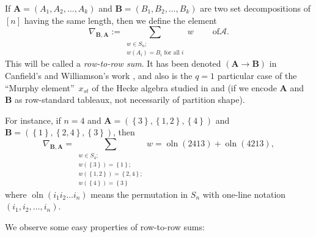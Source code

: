 \documentclass[numbers=enddot,12pt,final,onecolumn,notitlepage]{scrartcl}%
\numberwithin{exer}{subsection}
\theoremstyle{definition}
\let\sumnonlimits\sum
\renewcommand{\sum}{\sumnonlimits\limits}
\begin{document}
If $\mathbf{A}=\left(  A_{1},A_{2},\ldots,A_{k}\right)  $ and $\mathbf{B}%
=\left(  B_{1},B_{2},\ldots,B_{k}\right)  $ are two set decompositions of
$\left[  n\right]  $ having the same length, then we define the element%
\begin{equation}
\nabla_{\mathbf{B},\mathbf{A}}:=\sum_{\substack{w\in S_{n};\\w\left(
A_{i}\right)  =B_{i}\text{ for all }i}}w\ \ \ \ \ \ \ \ \ \ \text{of
}\mathcal{A}. \label{eq.NabBA.def}%
\end{equation}
This will be called a \emph{row-to-row sum}. It has been denoted $\left(
\mathbf{A}\rightarrow\mathbf{B}\right)  $ in Canfield's and Williamson's work
\cite{CanWil89}, and also is the $q=1$ particular case of the
\textquotedblleft Murphy element\textquotedblright\ $x_{st}$ of the Hecke
algebra studied in \cite[\S 3]{Murphy92} and \cite[\S 4]{Murphy95} (if we
encode $\mathbf{A}$ and $\mathbf{B}$ as row-standard tableaux, not necessarily
of partition shape).

For instance, if $n=4$ and $\mathbf{A}=\left(  \left\{  3\right\}  ,\left\{
1,2\right\}  ,\left\{  4\right\}  \right)  $ and $\mathbf{B}=\left(  \left\{
1\right\}  ,\left\{  2,4\right\}  ,\left\{  3\right\}  \right)  $, then%
\[
\nabla_{\mathbf{B},\mathbf{A}}=\sum_{\substack{w\in S_{4};\\w\left(  \left\{
3\right\}  \right)  =\left\{  1\right\}  ;\\w\left(  \left\{  1,2\right\}
\right)  =\left\{  2,4\right\}  ;\\w\left(  \left\{  4\right\}  \right)
=\left\{  3\right\}  }}w=\operatorname*{oln}\left(  2413\right)
+\operatorname*{oln}\left(  4213\right)  ,
\]
where $\operatorname*{oln}\left(  i_{1}i_{2}\ldots i_{n}\right)  $ means the
permutation in $S_{n}$ with one-line notation $\left(  i_{1},i_{2}%
,\ldots,i_{n}\right)  $.

We observe some easy properties of row-to-row sums:
\end{document}

